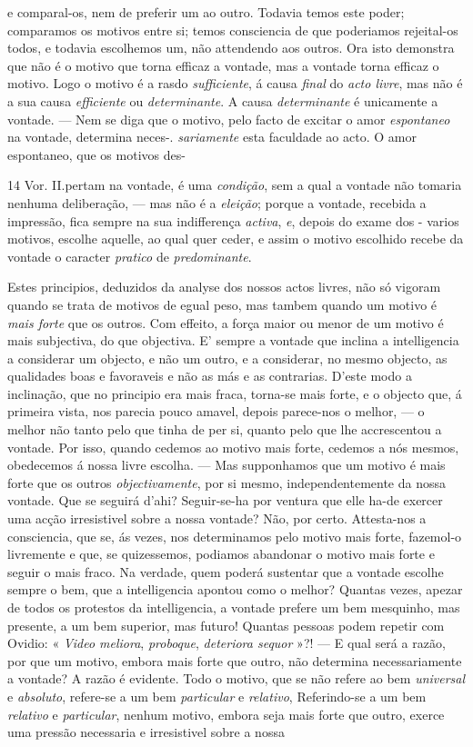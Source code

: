 e comparal-os, nem de preferir um ao outro. Todavia temos este poder; comparamos os motivos entre si; temos consciencia de que poderiamos rejeital-os todos, e todavia escolhemos um, não attendendo aos outros. Ora isto demonstra que não é o motivo que torna efficaz a vontade, mas a vontade torna efficaz o motivo. Logo o motivo é a rasdo \emph{sufficiente}, á causa \emph{final} do \emph{acto livre}, mas não é a sua causa \emph{efficiente} ou \emph{determinante}. A causa \emph{determinante} é unicamente a vontade. --- Nem se diga que o motivo, pelo facto de excitar o amor \emph{espontaneo} na vontade, determina neces-. \emph{sariamente} esta faculdade ao acto. O amor espontaneo, que os motivos des-\par 14 Vor. II.pertam na vontade, é uma \emph{condição}, sem a qual a vontade não tomaria nenhuma deliberação, --- mas não é a \emph{eleição}; porque a vontade, recebida a impressão, fica sempre na sua indifferença \emph{activa}, \emph{e}, depois do exame dos - varios motivos, escolhe aquelle, ao qual quer ceder, e assim o motivo escolhido recebe da vontade o caracter \emph{pratico} de \emph{predominante}.\par Estes principios, deduzidos da analyse dos nossos actos livres, não só vigoram quando se trata de motivos de egual peso, mas tambem quando um motivo é \emph{mais forte} que os outros. Com effeito, a força maior ou menor de um motivo é mais subjectiva, do que objectiva. E' sempre a vontade que inclina a intelligencia a considerar um objecto, e não um outro, e a considerar, no mesmo objecto, as qualidades boas e favoraveis e não as más e as contrarias. D'este modo a inclinação, que no principio era mais fraca, torna-se mais forte, e o objecto que, á primeira vista, nos parecia pouco amavel, depois parece-nos o melhor, --- o melhor não tanto pelo que tinha de per si, quanto pelo que lhe accrescentou a vontade. Por isso, quando cedemos ao motivo mais forte, cedemos a nós mesmos, obedecemos á nossa livre escolha. --- Mas supponhamos que um motivo é mais forte que os outros \emph{objectivamente}, por si mesmo, independentemente da nossa vontade. Que se seguirá d'ahi? Seguir-se-ha por ventura que elle ha-de exercer uma acção irresistivel sobre a nossa vontade? Não, por certo. Attesta-nos a consciencia, que se, ás vezes, nos determinamos pelo motivo mais forte, fazemol-o livremente e que, se quizessemos, podiamos abandonar o motivo mais forte e seguir o mais fraco. Na verdade, quem poderá sustentar que a vontade escolhe sempre o bem, que a intelligencia apontou como o melhor? Quantas vezes, apezar de todos os protestos da intelligencia, a vontade prefere um bem mesquinho, mas presente, a um bem superior, mas futuro! Quantas pessoas podem repetir com Ovidio: « \emph{Video meliora}, \emph{proboque}, \emph{deteriora sequor} »?! --- E qual será a razão, por que um motivo, embora mais forte que outro, não determina necessariamente a vontade? A razão é evidente. Todo o motivo, que se não refere ao bem \emph{universal} e \emph{absoluto}, refere-se a um bem \emph{particular} e \emph{relativo}, Referindo-se a um bem \emph{relativo} e \emph{particular}, nenhum motivo, embora seja mais forte que outro, exerce uma pressão necessaria e irresistivel sobre a nossa 